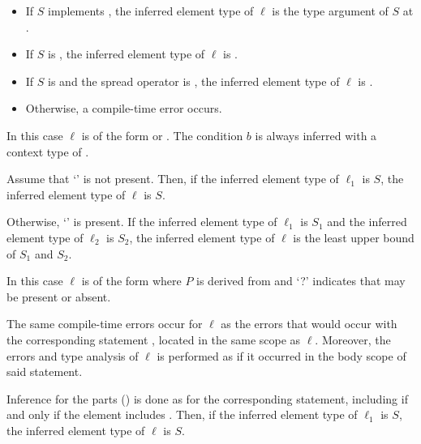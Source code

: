 \documentclass[makeidx]{article}
\begin{document}
{\begin{itemize}
\item
  If $S$ implements ,
  the inferred element type of $\ell$ is
  the type argument of $S$ at .
\item
  If $S$ is \DYNAMIC{},
  the inferred element type of $\ell$ is \DYNAMIC.
\item
  If $S$ is  and the spread operator is ,
  the inferred element type of $\ell$ is .
\item
  Otherwise, a compile-time error occurs.
\end{itemize}
\vspace{-5mm}
\EndCase

\LMHash{}%
In this case $\ell$ is of the form
 or
.
The condition $b$ is always inferred with a context type of .

Assume that `' is not present.
Then, if the inferred element type of $\ell_1$ is $S$,
the inferred element type of $\ell$ is $S$.

Otherwise, `' is present.
If the inferred element type of $\ell_1$ is $S_1$ and
the inferred element type of $\ell_2$ is $S_2$,
the inferred element type of $\ell$ is
the least upper bound of $S_1$ and $S_2$.
\EndCase

\LMHash{}%
In this case $\ell$ is of the form
where $P$ is derived from  and
`\AWAIT?' indicates that \AWAIT{} may be present or absent.

The same compile-time errors occur for $\ell$ as
the errors that would occur with the corresponding \FOR{} statement
,
located in the same scope as $\ell$.
Moreover, the errors and type analysis of $\ell$ is performed
as if it occurred in the body scope of said \FOR{} statement.

Inference for the parts
()
is done as for the corresponding \FOR{} statement,
including \AWAIT{} if and only if the element includes \AWAIT.
Then, if the inferred element type of $\ell_1$ is $S$,
the inferred element type of $\ell$ is $S$.

}
\end{document}
